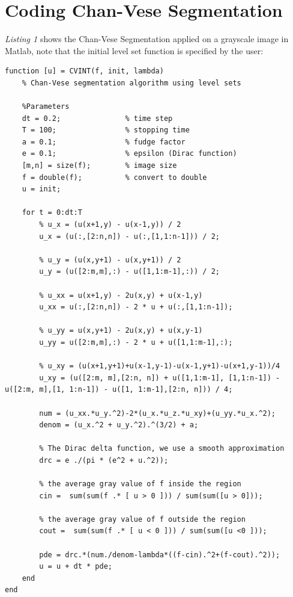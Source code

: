 \documentclass[a4paper,11pt]{article}
\begin{document}
\section*{Coding Chan-Vese Segmentation}
\emph{Listing 1} shows the Chan-Vese Segmentation applied on a grayscale image in Matlab, note that the initial level set function is specified by the user: \\
\begin{lstlisting}[caption={Chan-Vese Segmentation function for grayscale images in Matlab},captionpos=b,style=Matlab-editor]
function [u] = CVINT(f, init, lambda)
    % Chan-Vese segmentation algorithm using level sets

    %Parameters
    dt = 0.2;               % time step
    T = 100;                % stopping time
    a = 0.1;                % fudge factor
    e = 0.1;                % epsilon (Dirac function)
    [m,n] = size(f);        % image size
    f = double(f);          % convert to double
    u = init;

    for t = 0:dt:T
        % u_x = (u(x+1,y) - u(x-1,y)) / 2
        u_x = (u(:,[2:n,n]) - u(:,[1,1:n-1])) / 2;

        % u_y = (u(x,y+1) - u(x,y+1)) / 2
        u_y = (u([2:m,m],:) - u([1,1:m-1],:)) / 2;

        % u_xx = u(x+1,y) - 2u(x,y) + u(x-1,y)
        u_xx = u(:,[2:n,n]) - 2 * u + u(:,[1,1:n-1]);

        % u_yy = u(x,y+1) - 2u(x,y) + u(x,y-1)
        u_yy = u([2:m,m],:) - 2 * u + u([1,1:m-1],:);

        % u_xy = (u(x+1,y+1)+u(x-1,y-1)-u(x-1,y+1)-u(x+1,y-1))/4
        u_xy = (u([2:m, m],[2:n, n]) + u([1,1:m-1], [1,1:n-1]) -  u([2:m, m],[1, 1:n-1]) - u([1, 1:m-1],[2:n, n])) / 4;

        num = (u_xx.*u_y.^2)-2*(u_x.*u_z.*u_xy)+(u_yy.*u_x.^2);
        denom = (u_x.^2 + u_y.^2).^(3/2) + a;

        % The Dirac delta function, we use a smooth approximation
        drc = e ./(pi * (e^2 + u.^2));

        % the average gray value of f inside the region
        cin =  sum(sum(f .* [ u > 0 ])) / sum(sum([u > 0]));

        % the average gray value of f outside the region
        cout =  sum(sum(f .* [ u < 0 ])) / sum(sum([u <0 ]));

        pde = drc.*(num./denom-lambda*((f-cin).^2+(f-cout).^2));
        u = u + dt * pde;
    end
end


\end{lstlisting}
\end{document}
